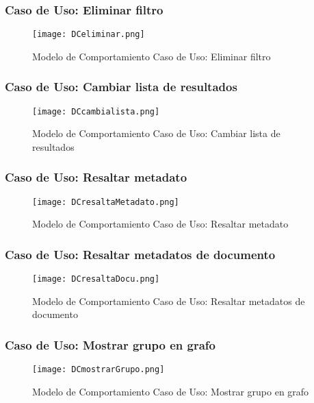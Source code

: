 \subsubsection{Caso de Uso: Eliminar filtro}
\begin{figure}[H]
  \centering
     \texttt{[image: DCeliminar.png]}
  \caption{Modelo de Comportamiento Caso de Uso: Eliminar filtro}
  \label{image:compoelimina}
\end{figure}
\subsubsection{Caso de Uso: Cambiar lista de resultados}
\begin{figure}[H]
  \centering
     \texttt{[image: DCcambialista.png]}
  \caption{Modelo de Comportamiento Caso de Uso: Cambiar lista de resultados}
  \label{image:compocambia}
\end{figure}
\subsubsection{Caso de Uso: Resaltar \gls{metadato}}
\begin{figure}[H]
  \centering
     \texttt{[image: DCresaltaMetadato.png]}
  \caption{Modelo de Comportamiento Caso de Uso: Resaltar \gls{metadato}}
  \label{image:compresalmeta}
\end{figure}
\subsubsection{Caso de Uso: Resaltar \glspl{metadato} de documento}
\begin{figure}[H]
  \centering
     \texttt{[image: DCresaltaDocu.png]}
  \caption{Modelo de Comportamiento Caso de Uso: Resaltar \glspl{metadato} de documento}
  \label{image:comporesaldoc}
\end{figure}
\subsubsection{Caso de Uso: Mostrar grupo en grafo}
\begin{figure}[H]
  \centering
     \texttt{[image: DCmostrarGrupo.png]}
  \caption{Modelo de Comportamiento Caso de Uso: Mostrar grupo en grafo}
  \label{image:compogropopgrafo}
\end{figure}


\section{} 

